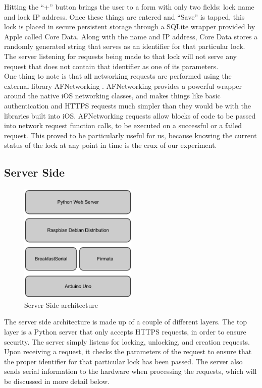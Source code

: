 \documentclass[10pt]{article}
\begin{document}
\begin{multicols}{2}
Hitting the ``+'' button brings the user to a form with only two fields: lock name and lock IP address. Once these things are entered and ``Save'' is tapped, this lock is placed in secure persistent storage through a SQLite wrapper provided by Apple called Core Data. Along with the name and IP address, Core Data stores a randomly generated string that serves as an identifier for that particular lock. The server listening for requests being made to that lock will not serve any request that does not contain that identifier as one of its parameters. \\

One thing to note is that all networking requests are performed using the external library AFNetworking \cite{afnetworking}. AFNetworking provides a powerful wrapper around the native iOS networking classes, and makes things like basic authentication and HTTPS requests much simpler than they would be with the libraries built into iOS. AFNetworking requests allow blocks of code to be passed into network request function calls, to be executed on a successful or a failed request. This proved to be particularly useful for us, because knowing the current status of the lock at any point in time is the crux of our experiment. \\

\subsection{Server Side}
\begin{figure}[H]
\centering
\includegraphics[width=0.5\textwidth]{stack.png}
\caption{Server Side architecture}
\end{figure}

The server side architecture is made up of a couple of different layers. The top layer is a Python server that only accepts HTTPS requests, in order to ensure security. The server simply listens for locking, unlocking, and creation requests. Upon receiving a request, it checks the parameters of the request to ensure that the proper identifier for that particular lock has been passed. The server also sends serial information to the hardware when processing the requests, which will be discussed in more detail below. \\


\end{multicols}
\end{document}
